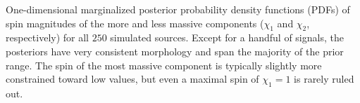 \label{fig:spinPDF} One-dimensional marginalized posterior probability density functions (PDFs) of spin magnitudes of the more and less massive components ($\chi_1$ and $\chi_2$, respectively) for all $250$ simulated sources. Except for a handful of signals, the posteriors have very consistent morphology and span the majority of the prior range.  The spin of the most massive component is typically slightly more constrained toward low values, but even a maximal spin of $\chi_1 = 1$ is rarely ruled out.
